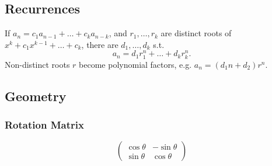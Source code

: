 \subsection{Recurrences}
If $a_n = c_1 a_{n-1} + \dots + c_k a_{n-k}$, and $r_1, \dots, r_k$ are distinct roots of $x^k + c_1 x^{k-1} + \dots + c_k$, there are $d_1, \dots, d_k$ s.t.
\[a_n = d_1r_1^n + \dots + d_kr_k^n. \]
Non-distinct roots $r$ become polynomial factors, e.g. $a_n = (d_1n + d_2)r^n$.

\subsection{Geometry}

\subsubsection{Rotation Matrix}

\[ \begin{pmatrix}
    \cos \theta & -\sin \theta \\
    \sin \theta & \cos \theta
\end{pmatrix} \]

